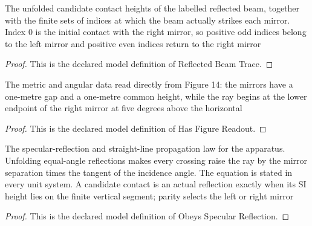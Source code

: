 \begin{definition}
  \label{def:physics:phyx-mini-0014:phyxminiproblems-problem0014-reflectedbeamtrace}
  The unfolded candidate contact heights of the labelled reflected beam, together with the finite sets of indices at which the beam actually strikes each mirror. Index 0 is the initial contact with the right mirror, so positive odd indices belong to the left mirror and positive even indices return to the right mirror
\end{definition}
\begin{proof}
  This is the declared model definition of Reflected Beam Trace.
\end{proof}
\begin{definition}
  \label{def:physics:phyx-mini-0014:phyxminiproblems-problem0014-hasfigurereadout}
  The metric and angular data read directly from Figure 14: the mirrors have a one-metre gap and a one-metre common height, while the ray begins at the lower endpoint of the right mirror at five degrees above the horizontal
\end{definition}
\begin{proof}
  This is the declared model definition of Has Figure Readout.
\end{proof}
\begin{definition}
  \label{def:physics:phyx-mini-0014:phyxminiproblems-problem0014-obeysspecularreflection}
  The specular-reflection and straight-line propagation law for the apparatus. Unfolding equal-angle reflections makes every crossing raise the ray by the mirror separation times the tangent of the incidence angle. The equation is stated in every unit system. A candidate contact is an actual reflection exactly when its SI height lies on the finite vertical segment; parity selects the left or right mirror
\end{definition}
\begin{proof}
  This is the declared model definition of Obeys Specular Reflection.
\end{proof}
